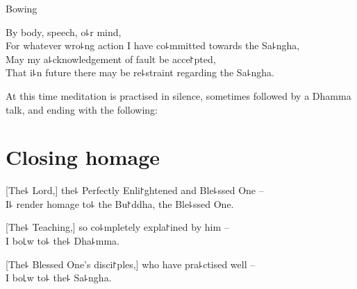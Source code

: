 \begin{instruction}
  Bowing
\end{instruction}

By body, speech, o꜕r mind,\\
For whatever wro꜕ng action I have co꜕mmitted towards the Sa꜕ngha,\\
May my a꜕cknowledgement of fault be acce꜓pted,\\
That i꜕n future there may be re꜕straint regarding the Sa꜕ngha.

\vfill

\begin{instruction}
  At this time meditation is practised in silence, sometimes followed by a Dhamma talk, and ending with the following:
\end{instruction}

\chapter{Closing homage}%

[The꜕ Lord,] the꜕ Perfectly Enli꜓ghtened and Ble꜕ssed One --\\
I꜕ render homage to꜕ the Bu꜓ddha, the Ble꜕ssed One. 

[The꜕ Teaching,] so co꜕mpletely expla꜓ined by him --\\
I bo꜖w to꜕ the꜕ Dha꜕mma. 

[The꜕ Blessed One's disci꜓ples,] who have pra꜕ctised well --\\
I bo꜖w to꜕ the꜕ Sa꜕ngha. 


